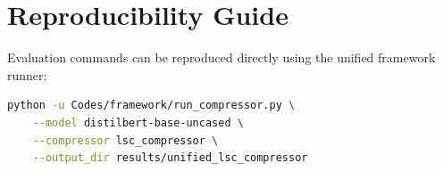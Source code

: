 \section{Reproducibility Guide}
Evaluation commands can be reproduced directly using the unified framework runner:
\begin{lstlisting}[language=bash]
python -u Codes/framework/run_compressor.py \
    --model distilbert-base-uncased \
    --compressor lsc_compressor \
    --output_dir results/unified_lsc_compressor
\end{lstlisting}
